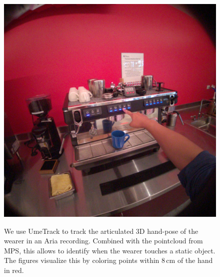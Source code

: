 \begin{figure}
    \centering
\includegraphics[width=0.49\linewidth]{images/applications/coffee.jpg}%
\hfill%
{%
\setlength{\fboxsep}{0pt}%
\setlength{\fboxrule}{0.5pt}%
}
    \caption{We use UmeTrack \cite{han2022umetrack} to track the articulated 3D hand-pose of the wearer in an Aria recording. Combined with the pointcloud from MPS, this allows to identify when the wearer touches a static object. The figures visualize this by coloring points within 8\,cm of the hand in red.}
    \label{fig:objectinteraction}
\end{figure}





